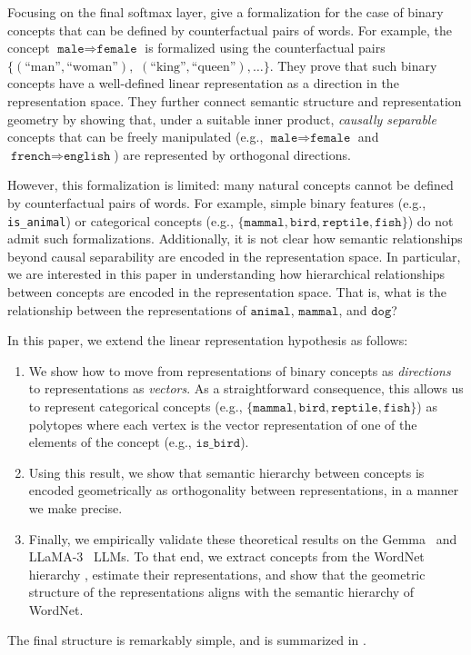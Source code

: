 \documentclass{article}
\newcommand{\ConceptName}[1]{$\mathtt{#1}$}
\newcommand{\ConceptValue}[1]{\texttt{#1}}
\newcommand{\ConceptDirName}[2]{\texttt{#1}\Rightarrow\texttt{#2}}
\begin{document}
Focusing on the final softmax layer,  give a formalization for the case of binary concepts that can be defined by counterfactual pairs of words.
For example, the concept $\ConceptDirName{male}{female}$ is formalized using the counterfactual pairs $\{(\text{``man''}, \text{``woman''}),$ $(\text{``king''}, \text{``queen''}), \dots\}$.
They prove that such binary concepts have a well-defined linear representation as a direction in the representation space.
They further connect semantic structure and representation geometry by showing that, under a suitable inner product, \emph{causally separable} concepts that can be freely manipulated (e.g., $\ConceptDirName{male}{female}$ and $\ConceptDirName{french}{english}$) are represented by orthogonal directions.

However, this formalization is limited: many natural concepts cannot be defined by counterfactual pairs of words. For example, simple binary features (e.g., \ConceptValue{is\_animal}) or categorical concepts (e.g., $\{\ConceptValue{mammal}, \ConceptValue{bird}, \ConceptValue{reptile}, \ConceptValue{fish}\}$) do not admit such formalizations. Additionally, it is not clear how semantic relationships beyond causal separability are encoded in the representation space. In particular, we are interested in this paper in understanding how hierarchical relationships between concepts are encoded in the representation space. That is, what is the relationship between the representations of \ConceptName{animal}, \ConceptName{mammal}, and \ConceptName{dog}?

In this paper, we extend the linear representation hypothesis as follows:
\begin{enumerate}
  \item We show how to move from representations of binary concepts as \emph{directions} to representations as \emph{vectors}. As a straightforward consequence, this allows us to represent categorical concepts (e.g., $\{\ConceptValue{mammal}, \ConceptValue{bird}, \ConceptValue{reptile}, \ConceptValue{fish}\}$) as polytopes where each vertex is the vector representation of one of the elements of the concept (e.g., $\ConceptValue{is\_bird}$).

  \item Using this result, we show that semantic hierarchy between concepts is encoded geometrically as orthogonality between representations, in a manner we make precise.

  \item Finally, we empirically validate these theoretical results on the Gemma~ and LLaMA-3~ LLMs. To that end, we extract concepts from the WordNet hierarchy , estimate their representations, and show that the geometric structure of the representations aligns with the semantic hierarchy of WordNet.
\end{enumerate}
The final structure is remarkably simple, and is summarized in .
\end{document}
